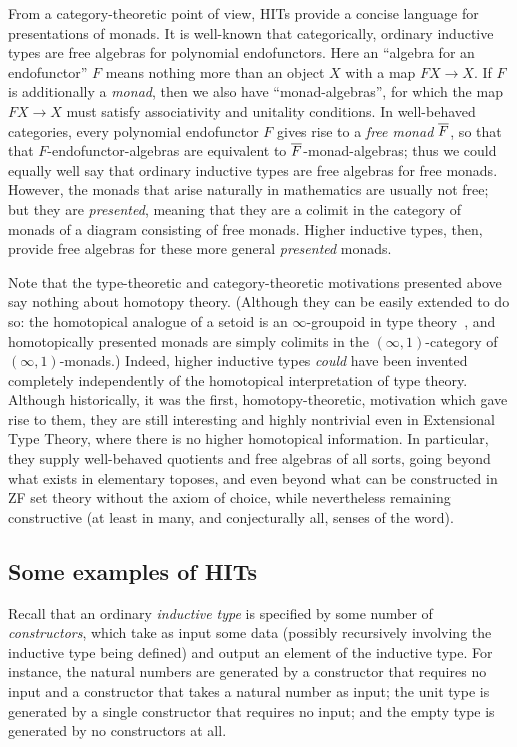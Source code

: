 \documentclass{amsart}
\begin{document}
From a category-theoretic point of view, HITs provide a concise language for presentations of monads.
It is well-known that categorically, ordinary inductive types are free algebras for polynomial endofunctors.
Here an ``algebra for an endofunctor'' $F$ means nothing more than an object $X$ with a map $FX \to X$.
If $F$ is additionally a \emph{monad}, then we also have ``monad-algebras'', for which the map $FX \to X$ must satisfy associativity and unitality conditions.
In well-behaved categories, every polynomial endofunctor $F$ gives rise to a \emph{free monad} $\overline{F}$, so that that $F$-endofunctor-algebras are equivalent to $\overline{F}$-monad-algebras; thus we could equally well say that ordinary inductive types are free algebras for free monads.
However, the monads that arise naturally in mathematics are usually not free; but they are \emph{presented}, meaning that they are a colimit in the category of monads of a diagram consisting of free monads.
Higher inductive types, then, provide free algebras for these more general \emph{presented} monads.

Note that the type-theoretic and category-theoretic motivations presented above say nothing about homotopy theory.
(Although they can be easily extended to do so: the homotopical analogue of a setoid is an $\infty$-groupoid in type theory~\cite{coquand...}, and homotopically presented monads are simply colimits in the $(\infty,1)$-category of $(\infty,1)$-monads.)
Indeed, higher inductive types \emph{could} have been invented completely independently of the homotopical interpretation of type theory.
Although historically, it was the first, homotopy-theoretic, motivation which gave rise to them, they are still interesting and highly nontrivial even in Extensional Type Theory, where there is no higher homotopical information.
In particular, they supply well-behaved quotients and free algebras of all sorts, going beyond what exists in elementary toposes, and even beyond what can be constructed in ZF set theory without the axiom of choice, while nevertheless remaining constructive (at least in many, and conjecturally all, senses of the word).


\subsection{Some examples of HITs}
\label{sec:hit-egs}

Recall that an ordinary \emph{inductive type} is specified by some number of \emph{constructors}, which take as input some data (possibly recursively involving the inductive type being defined) and output an element of the inductive type.
For instance, the natural numbers are generated by a constructor \fzero that requires no input and a constructor \fsucc that takes a natural number as input; the unit type is generated by a single constructor \ftt that requires no input; and the empty type is generated by no constructors at all.
\end{document}
